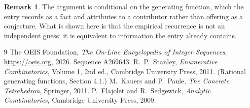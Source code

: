 \documentclass[11pt,a4paper]{article}
\theoremstyle{plain}
\theoremstyle{definition}
\newtheorem{remark}[theorem]{Remark}
\begin{document}
\begin{remark}
The argument is conditional on the generating function, which the entry records as a fact and
attributes to a contributor rather than offering as a conjecture. What is shown here is that
the empirical recurrence is not an independent guess: it is equivalent to information the
entry already contains.
\end{remark}

\begin{thebibliography}{9}
 The OEIS Foundation, \emph{The On-Line Encyclopedia of Integer
Sequences}, \url{https://oeis.org}, 2026. Sequence A269643.
 R.~P.~Stanley, \emph{Enumerative Combinatorics}, Volume 1, 2nd ed.,
Cambridge University Press, 2011. (Rational generating functions, Section 4.1.)
 M.~Kauers and P.~Paule, \emph{The Concrete Tetrahedron}, Springer, 2011.
 P.~Flajolet and R.~Sedgewick, \emph{Analytic Combinatorics}, Cambridge
University Press, 2009.
\end{thebibliography}
\end{document}
